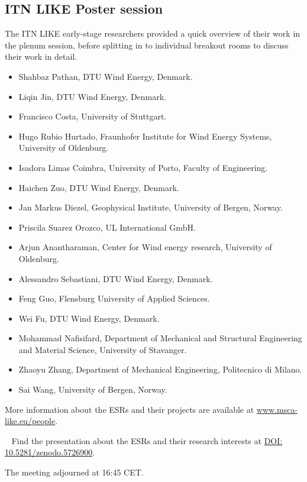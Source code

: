 \subsection{ITN LIKE Poster session}

The ITN LIKE early-stage researchers provided a quick overview of their work in the plenum session, before splitting in to individual breakout rooms to discuss their work in detail.  

\begin{itemize}
\item Shahbaz Pathan, DTU Wind Energy, Denmark.
\item Liqin Jin, DTU Wind Energy, Denmark.
\item Francisco Costa, University of Stuttgart.
\item Hugo Rubio Hurtado, Fraunhofer Institute for Wind Energy Systems, University of Oldenburg.
\item Isadora Limas Coimbra, University of Porto, Faculty of Engineering.
\item Haichen Zuo, DTU Wind Energy, Denmark.
\item Jan Markus Diezel, Geophysical Institute, University of Bergen, Norway.
\item Priscila Suarez Orozco, UL International GmbH.
\item Arjun Anantharaman, Center for Wind energy research, University of Oldenburg.
\item Alessandro Sebastiani, DTU Wind Energy, Denmark.
\item Feng Guo, Flensburg University of Applied Sciences.
\item Wei Fu, DTU Wind Energy, Denmark.
\item Mohammad Nafisifard, Department of Mechanical and Structural Engineering and Material Science, University of Stavanger.
\item Zhaoyu Zhang, Department of Mechanical Engineering, Politecnico di Milano.
\item Sai Wang, University of Bergen, Norway.
\end{itemize}

More information about the ESRs and their projects are available at \href{https://www.msca-like.eu/People}{www.msca-like.eu/people}. 

\faFilePowerpointO~ Find the presentation about the ESRs and their research interests at \href{https://doi.org/10.5281/zenodo.5726900
}{DOI: 10.5281/zenodo.5726900}. 

The meeting adjourned at 16:45 CET.
